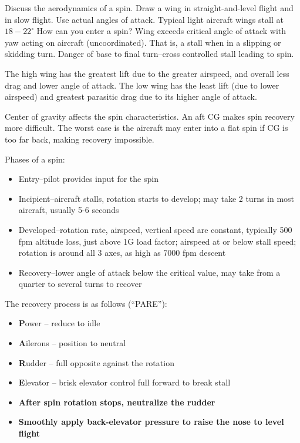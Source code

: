 \documentclass[twoside,openright]{report}
\begin{document}
Discuss the aerodynamics of a spin. Draw a wing in straight-and-level flight
and in slow flight. Use actual angles of attack. Typical light aircraft wings
stall at $18-22^{\circ}$ How can you enter a spin? Wing exceeds critical angle
of attack with yaw acting on aircraft (uncoordinated). That is, a stall when in
a slipping or skidding turn. Danger of base to final turn--cross controlled
stall leading to spin.

The high wing has the greatest lift due to the greater airspeed, and overall
less drag and lower angle of attack. The low wing has the least lift (due to
lower airspeed) and greatest parasitic drag due to its higher angle of attack.

Center of gravity affects the spin characteristics. An aft CG makes spin
recovery more difficult. The worst case is the aircraft may enter into a flat
spin if CG is too far back, making recovery impossible.

Phases of a spin:
\begin{itemize}
  \item Entry--pilot provides input for the spin
  \item Incipient--aircraft stalls, rotation starts to develop; may take 2
    turns in most aircraft, usually 5-6 seconds
  \item Developed--rotation rate, airspeed, vertical speed are constant,
    typically 500 fpm altitude loss, just above 1G load factor; airspeed at or
    below stall speed; rotation is around all 3 axes, as high as 7000 fpm
    descent
  \item Recovery--lower angle of attack below the critical value, may take from a
    quarter to several turns to recover
\end{itemize}

The recovery process is as follows (``PARE''):
\begin{itemize}
  \item \textbf{P}ower -- reduce to idle
  \item \textbf{A}ilerons -- position to neutral
  \item \textbf{R}udder -- full opposite against the rotation
  \item \textbf{E}levator -- brisk elevator control full forward to break stall
  \item \textbf{After spin rotation stops, neutralize the rudder}
  \item \textbf{Smoothly apply back-elevator pressure to raise the nose to
    level flight}
\end{itemize}
\end{document}
